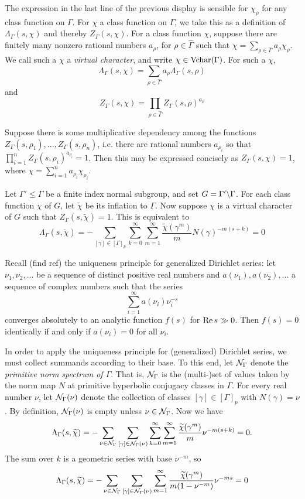 \documentclass[11pt]{amsart}
\begin{document}
The expression in the last line of the previous display is sensible for $\chi_\rho$ for any class function on $\Gamma$. For $\chi$ a class function on $\Gamma$, we take this as a definition of $\Lambda_\Gamma(s,\chi)$ and thereby $Z_\Gamma(s,\chi)$. For a class function $\chi$, suppose there are finitely many nonzero rational numbers $a_\rho$, for $\rho \in \hat{\Gamma}$ such that  $\chi=\sum_{\rho \in \hat{\Gamma}}a_\rho \chi_\rho$. We call such a $\chi$ a \emph{virtual character}, and write $\chi \in \operatorname{Vchar}(\Gamma)$. For such a $\chi$, 
\[ \Lambda_\Gamma(s,\chi)=\sum_{\rho\in \hat{\Gamma}} a_\rho \Lambda_\Gamma(s,\rho) \]
and
\[ Z_\Gamma(s,\chi)=\prod_{\rho\in \hat{\Gamma}} Z_\Gamma(s,\rho)^{a_\rho} \]

Suppose there is some multiplicative dependency among the functions $Z_\Gamma(s,\rho_1),...,Z_\Gamma(s,\rho_n)$, i.e. there are rational numbers $a_{\rho_i}$ so that $\prod_{i=1}^n Z_\Gamma(s,\rho_i)^{a_{\rho_i}}=1$. Then this may be expressed concisely as $Z_\Gamma(s,\chi)=1$, where $\chi=\sum_{i=1}^n a_{\rho_i} \chi_{\rho_i}$.

Let $\Gamma'\leq \Gamma$ be a finite index normal subgroup, and set $G=\Gamma'\backslash \Gamma$. For each class function $\chi$ of $G$, let $\tilde{\chi}$ be its inflation to $\Gamma$. Now suppose $\chi$ is a virtual character of $G$ such that $Z_\Gamma(s,\tilde{\chi})=1$. This is equivalent to 
	\[ \Lambda_\Gamma(s,\tilde{\chi})= -\sum_{[\gamma]\in [\Gamma]_p} \sum_{k=0}^\infty\sum_{m=1}^\infty \frac{\tilde{\chi}(\gamma^m)}{m}N(\gamma)^{-m(s+k)}=0 \]

Recall (find ref) the uniqueness principle for generalized Dirichlet series: let $\nu_1, \nu_2,...$ be a sequence of distinct positive real numbers and $a(\nu_1),a(\nu_2),...$ a sequence of complex numbers such that the series 
	\[ \sum_{i=1}^\infty a(\nu_i)\nu_i^{-s}\]
	converges absolutely to an analytic function $f(s)$ for $\operatorname{Re} s \gg 0$. Then $f(s)=0$ identically if and only if $a(\nu_i)=0$ for all $\nu_i$.  


In order to apply the uniqueness principle for (generalized) Dirichlet series, we must collect summands according to their base.  To this end, let $\mathcal{N}_\Gamma$ denote the \emph{primitive norm spectrum of $\Gamma$}. That is, $\mathcal{N}_\Gamma$ is the (multi-)set of values taken by the norm map $N$ at primitive hyperbolic conjugacy classes in $\Gamma$. For every real number $\nu$, let $\mathcal{N}_\Gamma(\nu)$ denote the collection of classes $[\gamma] \in [\Gamma]_p$ with $N(\gamma)=\nu$. By definition, $\mathcal{N}_\Gamma(\nu)$ is empty unless $\nu \in \mathcal{N}_\Gamma$. 
Now we have 
	\[ \Lambda_\Gamma(s,\widetilde{\chi})=-\sum_{\nu \in \mathcal{N}_\Gamma} \sum_{[\gamma] \in \mathcal{N}_\Gamma(\nu)} \sum_{k=0}^\infty\sum_{m=1}^\infty \frac{\widetilde{\chi}(\gamma^m)}{m}\nu ^{-m(s+k)}=0. \]
The sum over $k$ is a geometric series with base $\nu^{-m}$, so 
	\[ \Lambda_\Gamma(s,\widetilde{\chi})=-\sum_{\nu \in \mathcal{N}_\Gamma} \sum_{[\gamma] \in \mathcal{N}_\Gamma(\nu)} \sum_{m=1}^\infty \frac{\widetilde{\chi}(\gamma^m)}{m(1-\nu^{-m})}\nu ^{-ms}=0  \] 
\end{document}
